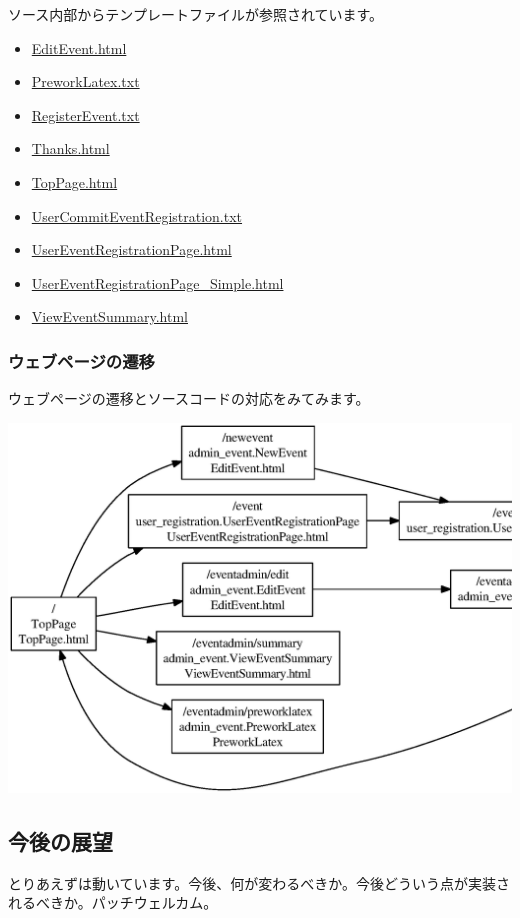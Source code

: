 \documentclass[mingoth,a4paper]{jsarticle}
\begin{document}
ソース内部からテンプレートファイルが参照されています。

\begin{itemize}
 \item \url{EditEvent.html}
 \item \url{PreworkLatex.txt}
 \item \url{RegisterEvent.txt}
 \item \url{Thanks.html}
 \item \url{TopPage.html}
 \item \url{UserCommitEventRegistration.txt}
 \item \url{UserEventRegistrationPage.html}
 \item \url{UserEventRegistrationPage_Simple.html}
 \item \url{ViewEventSummary.html}
\end{itemize}

\subsubsection{ウェブページの遷移}

ウェブページの遷移とソースコードの対応をみてみます。

\includegraphics[width=1\hsize]{image201001/debian-reservation-flow.eps}


\subsection{今後の展望}


とりあえずは動いています。今後、何が変わるべきか。今後どういう点が実装さ
れるべきか。パッチウェルカム。
\end{document}
